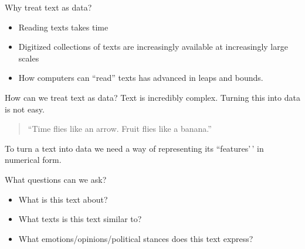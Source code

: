 \documentclass[
  10pt,
  ignorenonframetext,
  aspectratio=169]{beamer}
\begin{document}
\begin{frame}{Why treat text as data?}
\protect\hypertarget{why-treat-text-as-data}{}
\begin{itemize}
  \item<1-> Reading texts takes time
  \item<2-> Digitized collections of texts are increasingly available at increasingly large scales
  \item<3-> How computers can ``read'' texts has advanced in leaps and bounds.
\end{itemize}
\end{frame}

\begin{frame}{How can we treat text as data?}
\protect\hypertarget{how-can-we-treat-text-as-data}{}
Text is incredibly complex. Turning this into data is not easy.

\medskip 
\begin{quote}
``Time flies like an arrow. Fruit flies like a banana.''
\end{quote}

\bigskip

To turn a text into data we need a way of representing its
``features'\,' in numerical form.

\end{frame}

\begin{frame}{What questions can we ask?}
\protect\hypertarget{what-questions-can-we-ask}{}
\begin{itemize}
  \item{What is this text about?}
  \item{What texts is this text similar to?}
  \item{What emotions/opinions/political stances does this text express?}
\end{itemize}
\end{frame}
\end{document}
